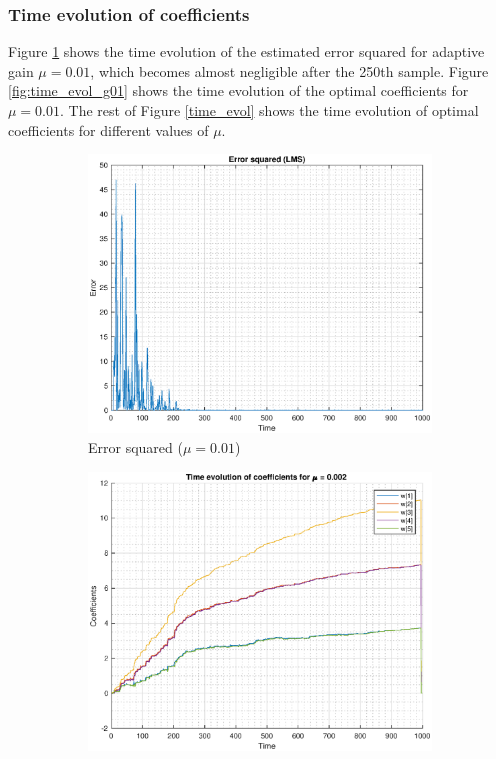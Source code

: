 \documentclass{article}
\begin{document}
\subsubsection{Time evolution of coefficients}

Figure \ref{fig:lms_error} shows the time evolution of the estimated error squared for adaptive gain $\mu=0.01$, which becomes almost negligible after the 250th sample. Figure \ref{fig:time_evol_g01} shows the time evolution of the optimal coefficients for $\mu=0.01$. The rest of Figure \ref{time_evol} shows the time evolution of optimal coefficients for different values of $\mu$. 

\begin{figure}[h!]
\centering
\begin{subfigure}{0.32\textwidth}
\centering
\includegraphics[width = \textwidth]{lms_error}
\caption{Error squared ($\mu=0.01$)}
\label{fig:lms_error}
\end{subfigure}
\begin{subfigure}{0.32\textwidth}
\centering
\includegraphics[width = \textwidth]{time_evol_g002}

\end{subfigure}
\end{figure}
\end{document}
